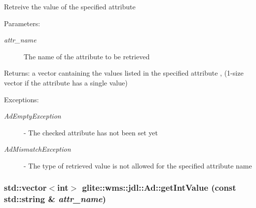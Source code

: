 Retreive the value of the specified attribute \begin{Desc}
\item[Parameters:]
\begin{description}
\item[{\em attr\_\-name}]The name of the attribute to be retrieved \end{description}
\end{Desc}
\begin{Desc}
\item[Returns:]a vector cantaining the values listed in the specified attribute , (1-size vector if the attribute has a single value) \end{Desc}
\begin{Desc}
\item[Exceptions:]
\begin{description}
\item[{\em Ad\-Empty\-Exception}]- The checked attribute has not been set yet \item[{\em Ad\-Mismatch\-Exception}]- The type of retrieved value is not allowed for the specified attribute name \end{description}
\end{Desc}
\hypertarget{classglite_1_1wms_1_1jdl_1_1Ad_z19_17}{
\subsubsection[getIntValue]{\setlength{\rightskip}{0pt plus 5cm}std::vector$<$int$>$ glite::wms::jdl::Ad::get\-Int\-Value (const std::string \& {\em attr\_\-name})}}
\label{classglite_1_1wms_1_1jdl_1_1Ad_z19_17}


